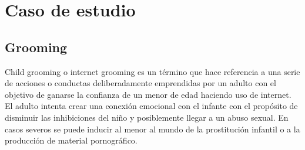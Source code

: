 \section{Caso de estudio}
\subsection{Grooming}
Child grooming o internet grooming es un t\'ermino que hace referencia a una serie de acciones o conductas deliberadamente emprendidas por un adulto con el objetivo de ganarse la confianza de un menor de edad haciendo uso de internet. El adulto intenta crear una conexi\'on emocional con el infante con el prop\'osito de disminuir las inhibiciones del ni\~no y posiblemente llegar a un abuso sexual. En casos severos se puede inducir al menor al mundo de la prostituci\'on infantil o a la producci\'on de material pornogr\'afico. \cite{grooming}